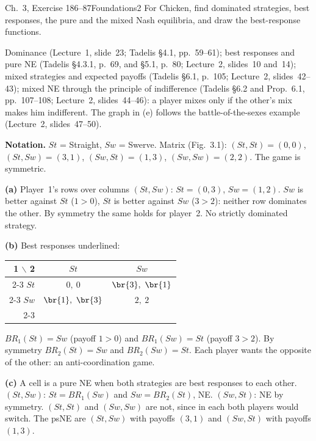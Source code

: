 \begin{exsol}{\MG{} Ch.~3, Exercise 1}{86--87}{Foundations}{2}
\asked For Chicken, find dominated strategies, best responses, the pure and the mixed Nash
equilibria, and draw the best-response functions.

\method Dominance (Lecture~1, slide~23; Tadelis \S4.1, pp.~59--61); best responses and pure NE
(Tadelis \S4.3.1, p.~69, and \S5.1, p.~80; Lecture~2, slides~10 and~14); mixed strategies and
expected payoffs (Tadelis \S6.1, p.~105; Lecture~2, slides~42--43); mixed NE through the principle
of indifference (Tadelis \S6.2 and Prop.~6.1, pp.~107--108; Lecture~2, slides~44--46): a player
mixes only if the other's mix makes him indifferent. The graph in (e) follows the battle-of-the-sexes
example (Lecture~2, slides~47--50).

\solution
\textbf{Notation.} $St$ = Straight, $Sw$ = Swerve. Matrix (Fig.~3.1): $(St,St) = (0,0)$,
$(St,Sw) = (3,1)$, $(Sw,St) = (1,3)$, $(Sw,Sw) = (2,2)$. The game is symmetric.

\textbf{(a)} Player~1's rows over columns $(St, Sw)$: $St = (0, 3)$, $Sw = (1, 2)$. $Sw$ is better
against $St$ ($1 > 0$), $St$ is better against $Sw$ ($3 > 2$): neither row dominates the other.
By symmetry the same holds for player~2. No strictly dominated strategy.

\textbf{(b)} Best responses underlined:
\begin{center}
\begin{tabular}{r|c|c|}
\multicolumn{1}{r}{1 $\backslash$ 2} & \multicolumn{1}{c}{$St$} & \multicolumn{1}{c}{$Sw$}\\ \cline{2-3}
$St$ & $0,\ 0$ & $\br{3},\ \br{1}$ \\ \cline{2-3}
$Sw$ & $\br{1},\ \br{3}$ & $2,\ 2$ \\ \cline{2-3}
\end{tabular}
\end{center}
$BR_1(St) = Sw$ (payoff $1 > 0$) and $BR_1(Sw) = St$ (payoff $3 > 2$). By symmetry
$BR_2(St) = Sw$ and $BR_2(Sw) = St$. Each player wants the opposite of the other: an
anti-coordination game.

\textbf{(c)} A cell is a pure NE when both strategies are best responses to each other.
$(St, Sw)$: $St = BR_1(Sw)$ and $Sw = BR_2(St)$, NE. $(Sw, St)$: NE by symmetry.
$(St,St)$ and $(Sw,Sw)$ are not, since in each both players would switch. The psNE are
$(St, Sw)$ with payoffs $(3,1)$ and $(Sw, St)$ with payoffs $(1,3)$.


\end{exsol}
